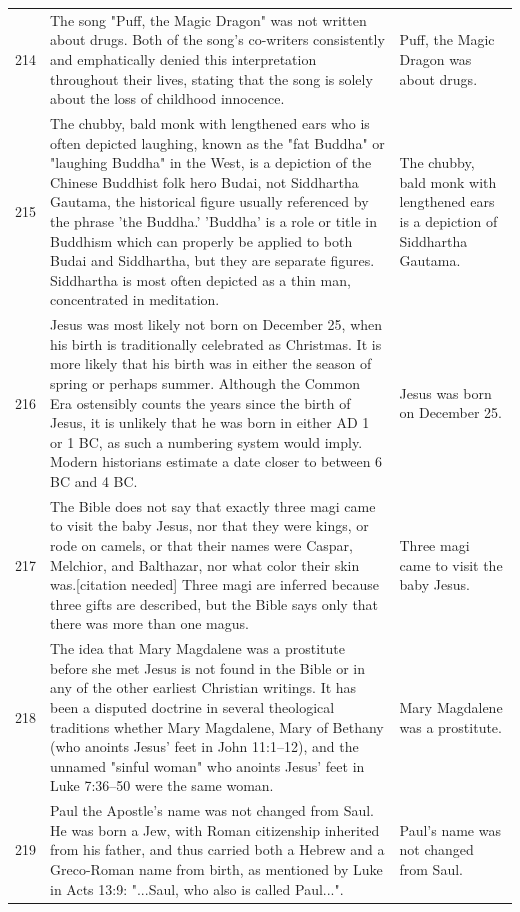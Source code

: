 \begin{tabular}{c|p{}|p{}}
214 & The song "Puff, the Magic Dragon" was not written about drugs. Both of the song's co-writers consistently and emphatically denied this interpretation throughout their lives, stating that the song is solely about the loss of childhood innocence. & Puff, the Magic Dragon was about drugs. \\
215 & The chubby, bald monk with lengthened ears who is often depicted laughing, known as the "fat Buddha" or "laughing Buddha" in the West, is a depiction of the Chinese Buddhist folk hero Budai, not Siddhartha Gautama, the historical figure usually referenced by the phrase 'the Buddha.' 'Buddha' is a role or title in Buddhism which can properly be applied to both Budai and Siddhartha, but they are separate figures. Siddhartha is most often depicted as a thin man, concentrated in meditation. & The chubby, bald monk with lengthened ears is a depiction of Siddhartha Gautama. \\
216 & Jesus was most likely not born on December 25, when his birth is traditionally celebrated as Christmas. It is more likely that his birth was in either the season of spring or perhaps summer. Although the Common Era ostensibly counts the years since the birth of Jesus, it is unlikely that he was born in either AD 1 or 1 BC, as such a numbering system would imply. Modern historians estimate a date closer to between 6 BC and 4 BC. & Jesus was born on December 25. \\
217 & The Bible does not say that exactly three magi came to visit the baby Jesus, nor that they were kings, or rode on camels, or that their names were Caspar, Melchior, and Balthazar, nor what color their skin was.[citation needed] Three magi are inferred because three gifts are described, but the Bible says only that there was more than one magus. & Three magi came to visit the baby Jesus. \\
218 & The idea that Mary Magdalene was a prostitute before she met Jesus is not found in the Bible or in any of the other earliest Christian writings. It has been a disputed doctrine in several theological traditions whether Mary Magdalene, Mary of Bethany (who anoints Jesus' feet in John 11:1–12), and the unnamed "sinful woman" who anoints Jesus' feet in Luke 7:36–50 were the same woman. & Mary Magdalene was a prostitute. \\
219 & Paul the Apostle's name was not changed from Saul. He was born a Jew, with Roman citizenship inherited from his father, and thus carried both a Hebrew and a Greco-Roman name from birth, as mentioned by Luke in Acts 13:9: "...Saul, who also is called Paul...". & Paul's name was not changed from Saul. \\

\end{tabular}
